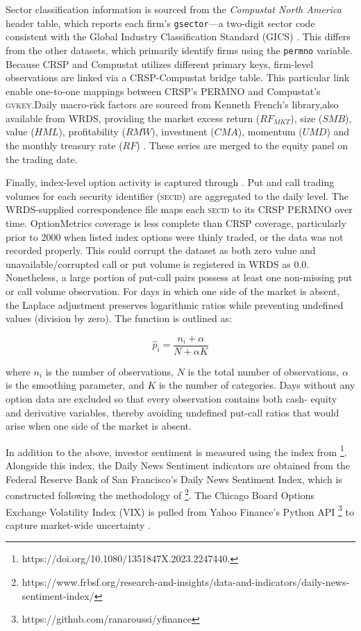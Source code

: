 Sector classification information is sourced from the \emph{Compustat North America} header table, which reports each firm's \texttt{gsector}—a two-digit sector code consistent with the Global Industry Classification Standard (GICS) \cite{compstat}. This differs from the other datasets, which primarily identify firms using the \texttt{permno} variable. Because CRSP and Compustat utilizes different primary keys, firm-level observations are linked via a CRSP-Compustat bridge table. This particular link enable one-to-one mappings between CRSP's PERMNO and Compustat's \textsc{gvkey}.Daily macro-risk factors are sourced from Kenneth French's library,also available from WRDS, providing the market excess return ($RF_{MKT}$), size ($SMB$), value ($HML$), profitability ($RMW$), investment ($CMA$), momentum ($UMD$) and the monthly treasury rate ($RF$) \cite{ff_wrds}. These series are merged to the equity panel on the trading date.

Finally, index-level option activity is captured through . Put and call trading volumes for each security identifier (\textsc{secid}) are aggregated to the daily level. The WRDS-supplied correspondence file maps each \textsc{secid} to its CRSP PERMNO over time. OptionMetrics coverage is less complete than CRSP coverage, particularly prior to 2000 when listed index options were thinly traded, or the data was not recorded properly. This could corrupt the dataset as both zero value and unavailable/corrupted call or put volume is registered in WRDS as 0.0. Nonetheless, a large portion of put-call pairs possess at least one non-missing put or call volume observation. For days in which one side of the market is absent, the Laplace adjustment preserves logarithmic ratios while preventing undefined values (division by zero). The function is outlined as:

\begin{equation}
     \hat{p}_i = \frac{n_i + \alpha}{N + \alpha K}
     \end{equation}

where $n_i$ is the number of observations, $N$ is the total number of observations, $\alpha$ is the smoothing parameter, and $K$ is the number of categories. Days without any option data are excluded so that every observation contains both cash- equity and derivative variables, thereby avoiding undefined put-call ratios that would arise when one side of the market is absent.

In addition to the above, investor sentiment is measured using the index from \footnote{https://doi.org/10.1080/1351847X.2023.2247440.}. Alongside this index, the Daily News Sentiment indicators are obtained from the Federal Reserve Bank of San Francisco's Daily News Sentiment Index, which is constructed following the methodology of  \footnote{https://www.frbsf.org/research-and-insights/data-and-indicators/daily-news-sentiment-index/}. The Chicago Board Options Exchange Volatility Index (VIX) is pulled from Yahoo Finance's Python API \footnote{https://github.com/ranaroussi/yfinance} to capture market-wide uncertainty \cite{vix_cboe}. 
 


